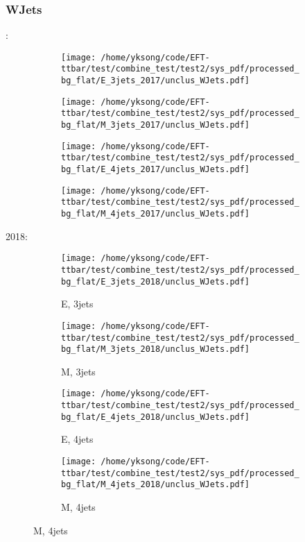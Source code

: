 \documentclass{beamer}
\begin{document}
\begin{frame}
\frametitle{WJets}
\fontsize{5}{1}:
\begin{figure}
\centering
\begin{subfigure}[b]{0.24\textwidth}
\texttt{[image: /home/yksong/code/EFT-ttbar/test/combine\_test/test2/sys\_pdf/processed\_bg\_flat/E\_3jets\_2017/unclus\_WJets.pdf]}
\end{subfigure}
\begin{subfigure}[b]{0.24\textwidth}
\texttt{[image: /home/yksong/code/EFT-ttbar/test/combine\_test/test2/sys\_pdf/processed\_bg\_flat/M\_3jets\_2017/unclus\_WJets.pdf]}
\end{subfigure}
\begin{subfigure}[b]{0.24\textwidth}
\texttt{[image: /home/yksong/code/EFT-ttbar/test/combine\_test/test2/sys\_pdf/processed\_bg\_flat/E\_4jets\_2017/unclus\_WJets.pdf]}
\end{subfigure}
\begin{subfigure}[b]{0.24\textwidth}
\texttt{[image: /home/yksong/code/EFT-ttbar/test/combine\_test/test2/sys\_pdf/processed\_bg\_flat/M\_4jets\_2017/unclus\_WJets.pdf]}
\end{subfigure}
\end{figure}
2018:
\begin{figure}
\centering
\begin{subfigure}[b]{0.24\textwidth}
\texttt{[image: /home/yksong/code/EFT-ttbar/test/combine\_test/test2/sys\_pdf/processed\_bg\_flat/E\_3jets\_2018/unclus\_WJets.pdf]}
\captionsetup{font=tiny}
\caption{E, 3jets}
\end{subfigure}
\begin{subfigure}[b]{0.24\textwidth}
\texttt{[image: /home/yksong/code/EFT-ttbar/test/combine\_test/test2/sys\_pdf/processed\_bg\_flat/M\_3jets\_2018/unclus\_WJets.pdf]}
\captionsetup{font=tiny}
\caption{M, 3jets}
\end{subfigure}
\begin{subfigure}[b]{0.24\textwidth}
\texttt{[image: /home/yksong/code/EFT-ttbar/test/combine\_test/test2/sys\_pdf/processed\_bg\_flat/E\_4jets\_2018/unclus\_WJets.pdf]}
\captionsetup{font=tiny}
\caption{E, 4jets}
\end{subfigure}
\begin{subfigure}[b]{0.24\textwidth}
\texttt{[image: /home/yksong/code/EFT-ttbar/test/combine\_test/test2/sys\_pdf/processed\_bg\_flat/M\_4jets\_2018/unclus\_WJets.pdf]}
\captionsetup{font=tiny}
\caption{M, 4jets}
\end{subfigure}
\end{figure}
\end{frame}
\end{document}
